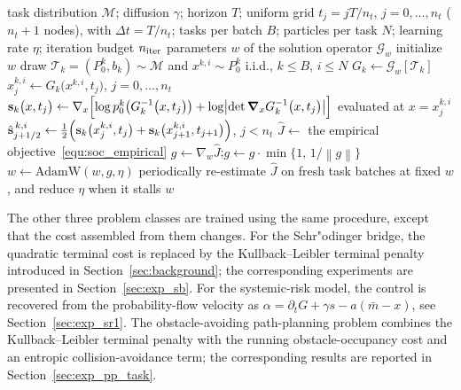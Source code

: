 \documentclass[preprint]{elsarticle}
\newcommand{\qb}[1]{\bigl(#1\bigr)}          %
\newcommand{\qB}[1]{\Bigl(#1\Bigr)}          %
\newcommand{\norm}[1]{\left\|#1\right\|}
\newcommand{\sM}{\mathcal{M}}
\newcommand{\sT}{\mathcal{T}}
\newcommand{\sG}{\mathcal{G}}
\newcommand{\inv}{^{-1}}
\begin{document}
\begin{algorithm}[!htbp]
\caption{Self-supervised training of the solution operator on the single-well stochastic optimal control family $\sT=(p_0,V)$.}
\label{alg:soc}
\begin{algorithmic}[1]
    \Require task distribution $\sM$; diffusion $\gamma$; horizon $T$; uniform grid $t_j=jT/n_t$, $j=0,\ldots,n_t$ ($n_t+1$ nodes), with $\Delta t=T/n_t$; tasks per batch $B$; particles per task $N$; learning rate $\eta$; iteration budget
    $n_{\rm iter}$
    \Ensure parameters $w$ of the solution operator $\sG_w$
    \State initialize $w$
      \State draw $\sT_k=(P_0^k,b_k)\sim\sM$ and $x^{k,i}\sim P_0^k$ i.i.d., $k\le B$, $i\le N$
      \State $G_k\leftarrow\sG_w[\sT_k]$
      \State $x^{k,i}_j\leftarrow G_k\qb{x^{k,i},t_j}$, \; $j=0,\ldots,n_t$
      \State $\mathbf{s}_k\qb{x,t_j}\leftarrow\nabla_x\Bigl[\log p_0^k\qb{G_k\inv\qb{x,t_j}}
             +\log\bigl|\det\boldsymbol{\nabla}_xG_k\inv\qb{x,t_j}\bigr|\Bigr]$
             evaluated at $x=x^{k,i}_j$
      \State $\hat{\mathbf{s}}^{\,k,i}_{j+1/2}\leftarrow\tfrac12
             \qB{\mathbf{s}_k\qb{x^{k,i}_j,t_j}+\mathbf{s}_k\qb{x^{k,i}_{j+1},t_{j+1}}}$, \; $j<n_t$
      \State $\hat J\leftarrow$ the empirical objective~\eqref{equ:soc_empirical}
      \State $g\leftarrow\nabla_w\hat J$;\quad $g\leftarrow g\cdot\min\{1,\,1/\norm{g}\}$
      \State $w\leftarrow\mathrm{AdamW}(w,g,\eta)$
      \State periodically re-estimate $\hat J$ on fresh task batches at fixed $w$, and reduce
             $\eta$ when it stalls
    \EndFor
    \State \Return $w$
\end{algorithmic}
\end{algorithm}

The other three problem classes are trained using the same procedure, except that the cost assembled from them changes. For the Schr"odinger bridge, the quadratic terminal cost is replaced by the Kullback--Leibler terminal penalty introduced in Section~\ref{sec:background}; the corresponding experiments are presented in Section~\ref{sec:exp_sb}. For the systemic-risk model, the control is recovered from the probability-flow velocity as $\alpha=\partial_tG+\gamma s-a(\bar m-x)$, see Section~\ref{sec:exp_sr1}. The obstacle-avoiding path-planning problem combines the Kullback--Leibler terminal penalty with the running obstacle-occupancy cost and an entropic collision-avoidance term; the corresponding results are reported in Section~\ref{sec:exp_pp_task}.
\end{document}
